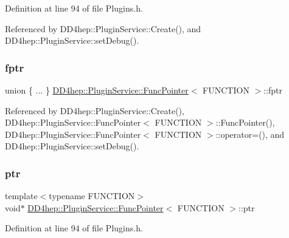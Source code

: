 Definition at line 94 of file Plugins.\+h.



Referenced by D\+D4hep\+::\+Plugin\+Service\+::\+Create(), and D\+D4hep\+::\+Plugin\+Service\+::set\+Debug().

\hypertarget{struct_d_d4hep_1_1_plugin_service_1_1_func_pointer_a148afe78c175741c86b0e99e1988562f}{}\label{struct_d_d4hep_1_1_plugin_service_1_1_func_pointer_a148afe78c175741c86b0e99e1988562f} 
\subsubsection{\texorpdfstring{fptr}{fptr}}
{\footnotesize\ttfamily union \{ ... \}   \hyperlink{struct_d_d4hep_1_1_plugin_service_1_1_func_pointer}{D\+D4hep\+::\+Plugin\+Service\+::\+Func\+Pointer}$<$ F\+U\+N\+C\+T\+I\+ON $>$\+::fptr}



Referenced by D\+D4hep\+::\+Plugin\+Service\+::\+Create(), D\+D4hep\+::\+Plugin\+Service\+::\+Func\+Pointer$<$ F\+U\+N\+C\+T\+I\+O\+N $>$\+::\+Func\+Pointer(), D\+D4hep\+::\+Plugin\+Service\+::\+Func\+Pointer$<$ F\+U\+N\+C\+T\+I\+O\+N $>$\+::operator=(), and D\+D4hep\+::\+Plugin\+Service\+::set\+Debug().

\hypertarget{struct_d_d4hep_1_1_plugin_service_1_1_func_pointer_a2de222ee867b2669e86af39351a05a68}{}\label{struct_d_d4hep_1_1_plugin_service_1_1_func_pointer_a2de222ee867b2669e86af39351a05a68} 
\subsubsection{\texorpdfstring{ptr}{ptr}}
{\footnotesize\ttfamily template$<$typename F\+U\+N\+C\+T\+I\+ON$>$ \\
void$\ast$ \hyperlink{struct_d_d4hep_1_1_plugin_service_1_1_func_pointer}{D\+D4hep\+::\+Plugin\+Service\+::\+Func\+Pointer}$<$ F\+U\+N\+C\+T\+I\+ON $>$\+::ptr}



Definition at line 94 of file Plugins.\+h.



